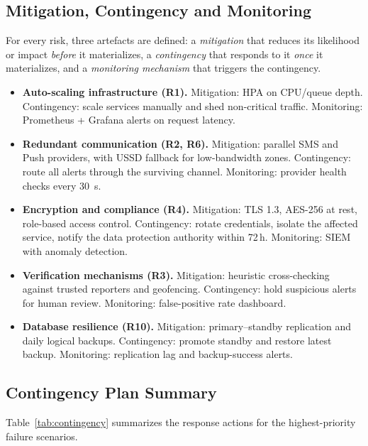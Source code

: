 \documentclass[conference,a4paper,10pt]{IEEEtran}
\begin{document}
\subsection{Mitigation, Contingency and Monitoring}

For every risk, three artefacts are defined: a \emph{mitigation} that reduces
its likelihood or impact \emph{before} it materializes, a \emph{contingency}
that responds to it \emph{once} it materializes, and a \emph{monitoring
mechanism} that triggers the contingency.

\begin{itemize}[leftmargin=*]
  \item \textbf{Auto-scaling infrastructure (R1).} Mitigation: HPA on
  CPU/queue depth. Contingency: scale services manually and shed
  non-critical traffic. Monitoring: Prometheus + Grafana alerts on
  request latency.
  \item \textbf{Redundant communication (R2, R6).} Mitigation: parallel SMS
  and Push providers, with USSD fallback for low-bandwidth zones.
  Contingency: route all alerts through the surviving channel.
  Monitoring: provider health checks every 30~s.
  \item \textbf{Encryption and compliance (R4).} Mitigation: TLS 1.3,
  AES-256 at rest, role-based access control. Contingency: rotate
  credentials, isolate the affected service, notify the data protection
  authority within 72\,h. Monitoring: SIEM with anomaly detection.
  \item \textbf{Verification mechanisms (R3).} Mitigation: heuristic
  cross-checking against trusted reporters and geofencing. Contingency:
  hold suspicious alerts for human review. Monitoring: false-positive
  rate dashboard.
  \item \textbf{Database resilience (R10).} Mitigation: primary--standby
  replication and daily logical backups. Contingency: promote standby and
  restore latest backup. Monitoring: replication lag and backup-success
  alerts.
\end{itemize}

\subsection{Contingency Plan Summary}

Table~\ref{tab:contingency} summarizes the response actions for the highest-priority
failure scenarios.
\end{document}
